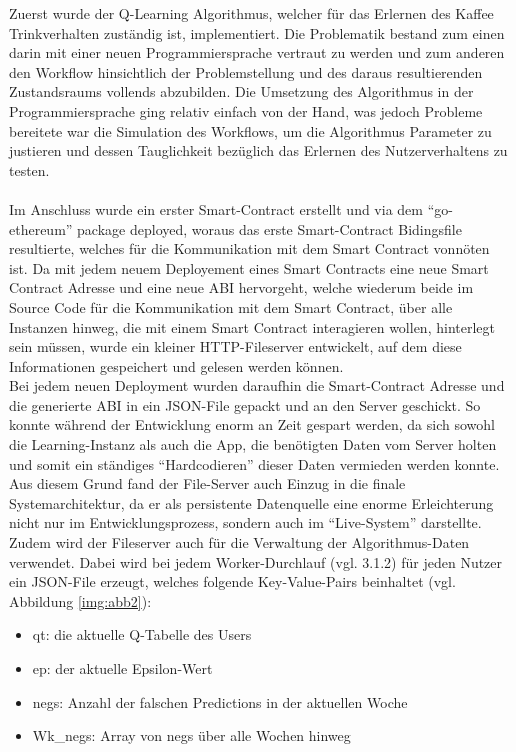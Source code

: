 Zuerst wurde der Q-Learning Algorithmus, welcher für das Erlernen des Kaffee Trinkverhalten zuständig ist, implementiert. Die Problematik bestand zum einen darin mit einer neuen Programmiersprache vertraut zu werden und zum anderen den Workflow hinsichtlich der Problemstellung und des daraus resultierenden Zustandsraums vollends abzubilden. Die Umsetzung des Algorithmus in der Programmiersprache ging relativ einfach von der Hand, was jedoch Probleme bereitete war die Simulation des Workflows, um die Algorithmus Parameter zu justieren und dessen Tauglichkeit bezüglich das Erlernen des Nutzerverhaltens zu testen.\\\\
Im Anschluss wurde ein erster Smart-Contract erstellt und via dem “go-ethereum” package deployed, woraus das erste Smart-Contract Bidingsfile resultierte, welches für die Kommunikation mit dem Smart Contract vonnöten ist. Da mit jedem neuem Deployement eines Smart Contracts eine neue Smart Contract Adresse und eine neue ABI hervorgeht, welche wiederum beide im Source Code für die Kommunikation mit dem Smart Contract, über alle Instanzen hinweg, die mit einem Smart Contract interagieren wollen, hinterlegt sein müssen, wurde ein kleiner HTTP-Fileserver entwickelt, auf dem diese Informationen gespeichert und gelesen werden können. \\
Bei jedem neuen Deployment wurden daraufhin die Smart-Contract Adresse und die generierte ABI in ein JSON-File gepackt und an den Server geschickt. So konnte während der Entwicklung enorm an Zeit gespart werden, da sich sowohl die Learning-Instanz als auch die App, die benötigten Daten vom Server holten und somit ein ständiges “Hardcodieren” dieser Daten vermieden werden konnte. \\
Aus diesem Grund fand der File-Server auch Einzug in die finale Systemarchitektur, da er als persistente Datenquelle eine enorme Erleichterung nicht nur im Entwicklungsprozess, sondern auch im “Live-System” darstellte. \\
Zudem wird der Fileserver auch für die Verwaltung der Algorithmus-Daten verwendet. Dabei wird bei jedem Worker-Durchlauf (vgl. 3.1.2) für jeden Nutzer ein JSON-File erzeugt, welches folgende Key-Value-Pairs beinhaltet (vgl. Abbildung \ref{img:abb2}): 
\begin{itemize}
	\item qt: die aktuelle Q-Tabelle des Users
	\item ep: der aktuelle Epsilon-Wert
	\item negs: Anzahl der falschen Predictions in der aktuellen Woche
	\item Wk\_negs: Array von negs über alle Wochen hinweg
\end{itemize}


